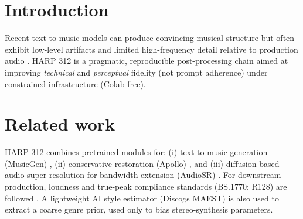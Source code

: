 \documentclass{article}
\begin{document}
\twocolumn[
\dlaititle{HARP 312 : Hybrid Audio Restoration Process}
\begin{center}December 29, 2025\end{center}
\begin{dlaiauthorlist}
\dlaiauthor{Federico Carattoli}{}
\end{dlaiauthorlist}


\begingroup
\spaceskip=0.333em\relax \xspaceskip=\spaceskip
\dlaicorrespondingauthor{Federico Carattoli}{\nolinkurl{carattoli.1715903@studenti.uniroma1.it}}
\endgroup

\vskip 0.3in
]

\printAffiliationsAndNotice{}

\begin{abstract}
HARP 312 (Hybrid Audio Restoration Process; “312” denotes the exploratory variant that set the project direction) targets fidelity issues in text-to-music generation by chaining pretrained restoration and bandwidth-extension models with lightweight DSP, followed by mono-safe stereo synthesis and loudness-normalized mastering. The pipeline is general for MusicGen outputs; this report documents one reproducible Colab run (additional proof samples are in the repository). Evaluation uses quick A/B listening on Audio-Technica ATH-M50X headphones plus physically interpretable diagnostics (spectral extension, M/S width, HF contrast, and loudness/true-peak compliance). 

\par\noindent Code and proof samples: \url{https://github.com/rlpb/HARP-312}\\
\noindent Demo: \url{https://harp312.netlify.app}
\end{abstract}

\section{Introduction}
Recent text-to-music models can produce convincing musical structure but often exhibit low-level artifacts and limited high-frequency detail relative to production audio \cite{copet2023musicgen}. HARP 312 is a pragmatic, reproducible post-processing chain aimed at improving \emph{technical} and \emph{perceptual} fidelity (not prompt adherence) under constrained infrastructure (Colab-free).

\section{Related work}
HARP 312 combines pretrained modules for: (i) text-to-music generation (MusicGen) \cite{copet2023musicgen}, (ii) conservative restoration (Apollo) \cite{jusperlee_apollo}, and (iii) diffusion-based audio super-resolution for bandwidth extension (AudioSR) \cite{liu2023audiosr}. For downstream production, loudness and true-peak compliance standards (BS.1770; R128) are followed \cite{itur_bs1770,ebu_r128}. A lightweight AI style estimator (Discogs MAEST) is also used to extract a coarse genre prior, used only to bias stereo-synthesis parameters.
\end{document}
